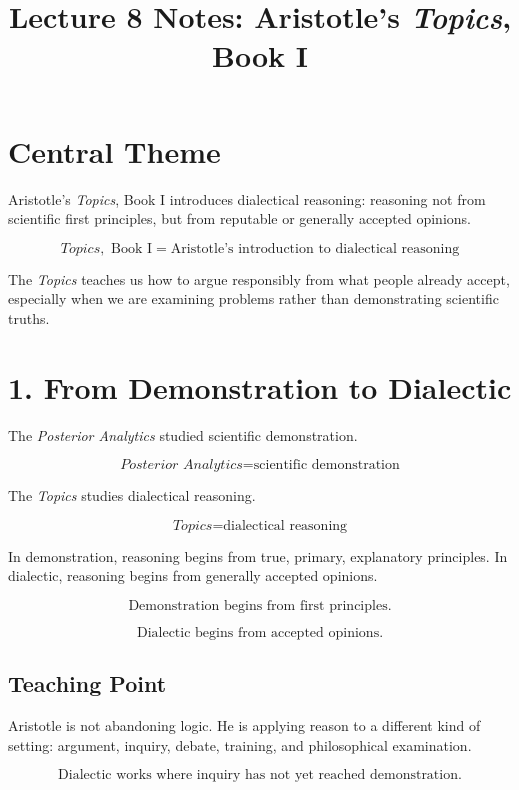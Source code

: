 \documentclass[12pt]{article}
\title{Lecture 8 Notes: Aristotle's \textit{Topics}, Book I}
\author{}
\date{}
\begin{document}
\maketitle

\section*{Central Theme}

Aristotle's \textit{Topics}, Book I introduces dialectical reasoning: reasoning
not from scientific first principles, but from reputable or generally accepted
opinions.

\[
\boxed{
\textit{Topics}, \text{ Book I}
=
\text{Aristotle's introduction to dialectical reasoning}
}
\]

The \textit{Topics} teaches us how to argue responsibly from what people
already accept, especially when we are examining problems rather than
demonstrating scientific truths.

\section*{1. From Demonstration to Dialectic}

The \textit{Posterior Analytics} studied scientific demonstration.

\[
\textit{Posterior Analytics} = \text{scientific demonstration}
\]

The \textit{Topics} studies dialectical reasoning.

\[
\textit{Topics} = \text{dialectical reasoning}
\]

In demonstration, reasoning begins from true, primary, explanatory principles.
In dialectic, reasoning begins from generally accepted opinions.

\[
\boxed{
\text{Demonstration begins from first principles.}
}
\]

\[
\boxed{
\text{Dialectic begins from accepted opinions.}
}
\]

\subsection*{Teaching Point}

Aristotle is not abandoning logic. He is applying reason to a different kind of
setting: argument, inquiry, debate, training, and philosophical examination.

\[
\boxed{
\text{Dialectic works where inquiry has not yet reached demonstration.}
}
\]
\end{document}
